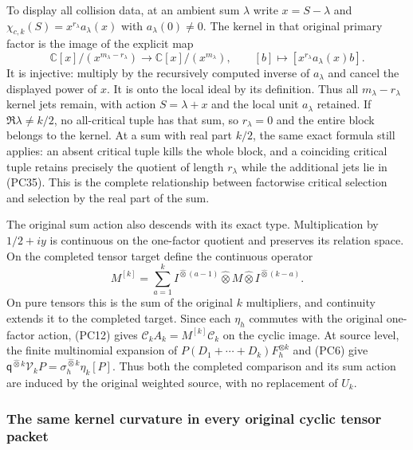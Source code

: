 To display all collision data, at an ambient sum $\lambda$ write
$x=S-\lambda$ and
$\chi_{c,k}(S)=x^{r_\lambda}a_\lambda(x)$ with
$a_\lambda(0)\ne0$.  The kernel in that original primary factor is
the image of the explicit map
\[
 \mathbb C[x]/(x^{m_\lambda-r_\lambda})
  \longrightarrow\mathbb C[x]/(x^{m_\lambda}),\qquad
 [b]\longmapsto[x^{r_\lambda}a_\lambda(x)b].
 \tag{PC35}
\]
It is injective: multiply by the recursively computed inverse of
$a_\lambda$ and cancel the displayed power of $x$.
It is onto the local ideal by its definition.  Thus all
$m_\lambda-r_\lambda$ kernel jets remain, with action
$S=\lambda+x$ and the local unit $a_\lambda$ retained.
If $\Re\lambda\ne k/2$, no all-critical tuple has that sum,
so $r_\lambda=0$ and the entire block belongs to the kernel.
At a sum with real part $k/2$, the same exact formula still
applies: an absent critical tuple kills the whole block, and a
coinciding critical tuple retains precisely the quotient of length
$r_\lambda$ while the additional jets lie in (PC35).
This is the complete relationship between factorwise critical
selection and selection by the real part of the sum.

The original sum action also descends with its exact type.  Multiplication
by $1/2+iy$ is continuous on the one-factor quotient and preserves its
relation space.  On the completed tensor target define the continuous
operator
\[
 M^{[k]}=\sum_{a=1}^k
       I^{\widehat\otimes(a-1)}\widehat\otimes M
                         \widehat\otimes I^{\widehat\otimes(k-a)}.
 \tag{PC36}
\]
On pure tensors this is the sum of the original $k$ multipliers,
and continuity extends it to the completed target.  Since each
$\eta_h$ commutes with the original one-factor action, (PC12)
gives $\mathcal C_kA_k=M^{[k]}\mathcal C_k$ on the cyclic image.
At source level, the finite multinomial expansion of
$P(D_1+\cdots+D_k)F_h^{\otimes k}$ and (PC6) give
$\mathsf q^{\widehat\otimes k}\mathcal V_kP
=\sigma_h^{\widehat\otimes k}\eta_k[P]$.
Thus both the completed comparison and its sum action are induced
by the original weighted source, with no replacement of $U_k$.

\subsubsection{The same kernel curvature in every original cyclic tensor packet}

